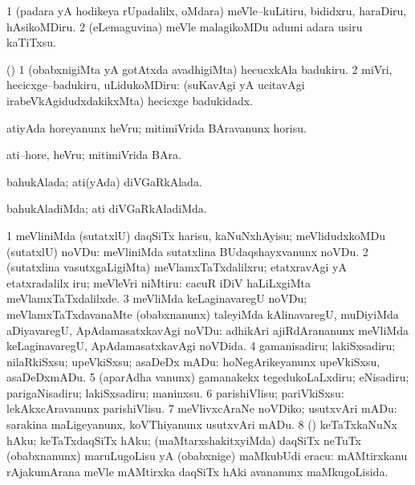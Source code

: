 \bentry
{}
\gl{\sakirx}
\bmng
\bnum
\num{1} (padara yA hodikeya rUpadalilx, oMdara) meVle--kuLitiru, bididxru, haraDiru, hAsikoMDiru. 
\num{2} (eLemaguvina) meVle malagikoMDu adumi adara usiru kaTiTxsu. 
\enum
\emng
\eentry


\bentry
{}
\gl{\sakirx}
\bmng
(\pArxparx) 
\bnum
\num{1} (obabxnigiMta yA gotAtxda avadhigiMta) hecucxkAla badukiru. 
\num{2} miVri, hecicxge--badukiru, uLidukoMDiru:  (suKavAgi yA ucitavAgi irabeVkAgidudxdakikxMta) hecicxge badukidadx. 
\enum
\emng
\eentry


\bentry
{}
\gl{\sakirx}
\bmng
atiyAda horeyanunx heVru; mitimiVrida BAravanunx horisu. 
\emng
\eentry


\bentry
{}
\gl{\nA}
\bmng
ati--hore, heVru; mitimiVrida BAra. 
\emng
\eentry


\bentry
{}
\gl{\gu}
\bmng
bahukAlada; ati(yAda) diVGaRkAlada. 
\emng
\eentry


\bentry
{}
\gl{\gu}
\bmng
bahukAladiMda; ati diVGaRkAladiMda. 
\emng
\eentry


\bentry
{}
\gl{\sakirx}
\bmng
\bnum
\num{1} meVliniMda (sutatxlU) daqSiTx harisu, kaNuNxhAyisu; meVlidudxkoMDu (sutatxlU) noVDu:  meVliniMda sutatxlina BUdaqshayxvanunx noVDu. 
\num{2} (sutatxlina vasutxgaLigiMta) meVlamxTaTxdalilxru; etatxravAgi yA etatxradalilx iru; meVleVri niMtiru:  cacuR iDiV haLiLxgiMta meVlamxTaTxdalilxde. 
\num{3} meVliMda keLaginavaregU noVDu; meVlamxTaTxdavanaMte (obabxnanunx) taleyiMda kAlinavaregU, muDiyiMda aDiyavaregU, ApAdamasatxkavAgi noVDu:  adhikAri ajiRdArananunx meVliMda keLaginavaregU, ApAdamasatxkavAgi noVDida. 
\num{4} gamanisadiru; lakiSxsadiru; nilaRkiSxsu; upeVkiSxsu; asaDeDx mADu:  hoNegArikeyanunx upeVkiSxsu, asaDeDxmADu. 
\num{5} (aparAdha \mo vanunx) gamanakekx tegedukoLaLxdiru; eNisadiru; parigaNisadiru; lakiSxsadiru; maninxsu. 
\num{6} parishiVlisu; pariVkiSxsu:  lekAkxcAravanunx parishiVlisu. 
\num{7} meVlivxcAraNe noVDiko; usutxvAri mADu:  sarakina maLigeyanunx, koVThiyanunx usutxvAri mADu. 
\num{8} (\pArxparx) keTaTxkaNuNx hAku; keTaTxdaqSiTx hAku; (maMtarxshakitxyiMda) daqSiTx neTuTx (obabxnanunx) maruLugoLisu yA (obabxnige) maMkubUdi eracu:  mAMtirxkanu rAjakumArana meVle mAMtirxka daqSiTx hAki avananunx maMkugoLisida. 
\enum
\emng
\eentry


